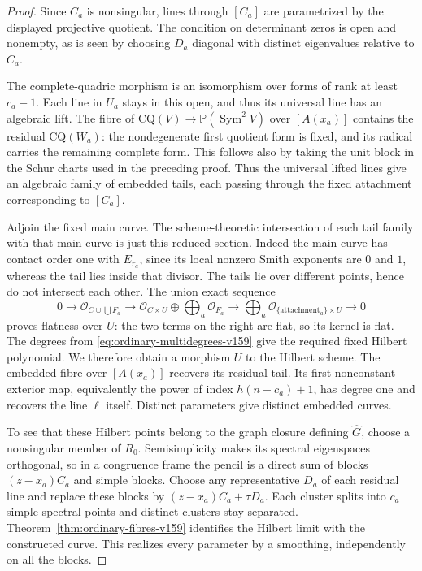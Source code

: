 \documentclass[11pt,reqno]{amsart}
\numberwithin{equation}{section}
\theoremstyle{definition}\newtheorem{definition}[theorem]{Definition}
\theoremstyle{remark}\newtheorem{remark}[theorem]{Remark}
\newcommand{\Pj}{\mathbb P}\newcommand{\A}{\mathbb A}
\newcommand{\OO}{\mathcal O}\newcommand{\II}{\mathcal I}
\DeclareMathOperator{\Sym}{Sym}\DeclareMathOperator{\Gr}{Gr}
\begin{document}
\begin{proof}
Since $C_a$ is nonsingular, lines through $[C_a]$ are parametrized
by the displayed projective quotient. The condition on determinant
zeros is open and nonempty, as is seen by choosing $D_a$ diagonal
with distinct eigenvalues relative to $C_a$.

The complete-quadric morphism is an isomorphism over forms of rank
at least $c_a-1$. Each line in $U_a$ stays in this open, and thus
its universal line has an algebraic lift. The fibre of
$\mathrm{CQ}(V)\to\Pj(\Sym^2V)$ over $[A(x_a)]$ contains the
residual $\mathrm{CQ}(W_a)$: the nondegenerate first quotient form
is fixed, and its radical carries the remaining complete form.
This follows also by taking the unit block in the Schur charts used
in the preceding proof. Thus the universal lifted lines give an
algebraic family of embedded tails, each passing through the fixed
attachment corresponding to $[C_a]$.

Adjoin the fixed main curve. The scheme-theoretic intersection of
each tail family with that main curve is just this reduced section.
Indeed the main curve has contact order one with $E_{r_a}$, since
its local nonzero Smith exponents are $0$ and $1$, whereas the tail
lies inside that divisor. The tails lie over different points, hence
do not intersect each other. The union exact sequence
\[
 0\longrightarrow\OO_{C\cup\bigcup F_a}
 \longrightarrow\OO_{C\times U}\oplus\bigoplus_a\OO_{F_a}
 \longrightarrow\bigoplus_a\OO_{\{\mathrm{attachment}_a\}\times U}
 \longrightarrow0
\]
proves flatness over $U$: the two terms on the right are flat, so
its kernel is flat. The degrees from
\eqref{eq:ordinary-multidegrees-v159} give the required fixed Hilbert
polynomial. We therefore obtain a morphism $U$ to the Hilbert scheme.
The embedded fibre over $[A(x_a)]$ recovers its residual tail. Its
first nonconstant exterior map, equivalently the power of index
$h(n-c_a)+1$, has degree one and recovers the line $\ell$ itself.
Distinct parameters give distinct embedded curves.

To see that these Hilbert points belong to the graph closure defining
$\widehat G$, choose a nonsingular member of $R_0$. Semisimplicity
makes its spectral eigenspaces orthogonal, so in a congruence frame
the pencil is a direct sum of blocks $(z-x_a)C_a$ and simple blocks.
Choose any representative $D_a$ of each residual line and replace
these blocks by $(z-x_a)C_a+\tau D_a$. Each cluster splits into
$c_a$ simple spectral points and distinct clusters stay separated.
Theorem~\ref{thm:ordinary-fibres-v159} identifies the Hilbert limit
with the constructed curve. This realizes every parameter by a
smoothing, independently on all the blocks.


\end{proof}
\end{document}

